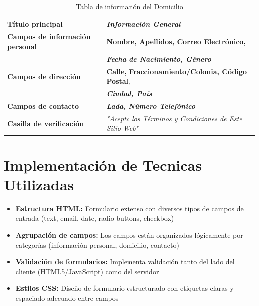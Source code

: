 \documentclass[11pt, a4paper, oneside]{book}
\begin{document}
\begin{table}[h]
    \centering
    \begin{tabular}{|l|l|}
        \hline
        \textbf{Título principal} & \textit{Información General} \\
        \hline
        \textbf{Campos de información personal} & \textbf{Nombre, Apellidos, Correo Electrónico,} \\
                                               & \textbf{\textit{Fecha de Nacimiento, Género}} \\
        \hline
        \textbf{Campos de dirección} & \textbf{Calle, Fraccionamiento/Colonia, Código Postal,} \\
                                     & \textbf{\textit{Ciudad, País}} \\
        \hline
        \textbf{Campos de contacto} & \textbf{\textit{Lada, Número Telefónico}} \\
        \hline
        \textbf{Casilla de verificación} & \textit{"Acepto los Términos y Condiciones de Este Sitio Web"} \\
        \hline
    \end{tabular}
    \caption{Tabla de información del Domicilio }
    \label{tab:info}
\end{table}

\section{Implementación de Tecnicas Utilizadas }


\begin{itemize}
\item \textbf { Estructura HTML:}   Formulario extenso con
 diversos tipos de campos de
 entrada (text, email, date,
 radio buttons, checkbox)
 
\item \textbf {Agrupación de campos:}  Los campos están
 organizados lógicamente
 por categorías
 (información personal,
 domicilio, contacto)
 
 \item \textbf { Validación de formularios:}  Implementa validación
 tanto del lado del cliente
 (HTML5/JavaScript) como
 del servidor
 
 \item \textbf {  Estilos CSS:}  Diseño de formulario
 estructurado con etiquetas
 claras y espaciado
 adecuado entre campos
 
 \end{itemize}
\end{document}
